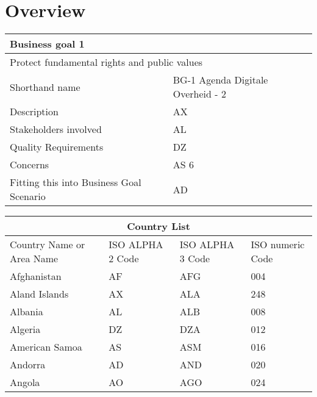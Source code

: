 \chapter{Overview}\label{s:overview}

\begin{tabular}{ |p{3cm}||p{3cm}|}
 \hline
 \multicolumn{2}{|l|}{Business goal 1} \\
 \hline
 \multicolumn{2}{|l|}{Protect fundamental rights and public values}\\
 \hline
 Shorthand name   & BG-1 Agenda Digitale Overheid - 2    \\
 \hline
 Description &   AX  \\
  \hline
 Stakeholders involved &AL \\
  \hline
 Quality Requirements   &DZ \\
  \hline
 Concerns &   AS  6\\
  \hline
 Fitting this into Business Goal Scenario & AD \\
 \hline
\end{tabular}


\begin{tabular}{ |p{3cm}||p{3cm}|p{3cm}|p{3cm}|  }
 \hline
 \multicolumn{4}{|c|}{Country List} \\
 \hline
 Country Name or Area Name& ISO ALPHA 2 Code &ISO ALPHA 3 Code&ISO numeric Code\\
 \hline
 Afghanistan   & AF    &AFG&   004\\
 Aland Islands&   AX  & ALA   &248\\
 Albania &AL & ALB&  008\\
 Algeria    &DZ & DZA&  012\\
 American Samoa&   AS  & ASM&016\\
 Andorra& AD  & AND   &020\\
 Angola& AO  & AGO&024\\
 \hline
\end{tabular}

